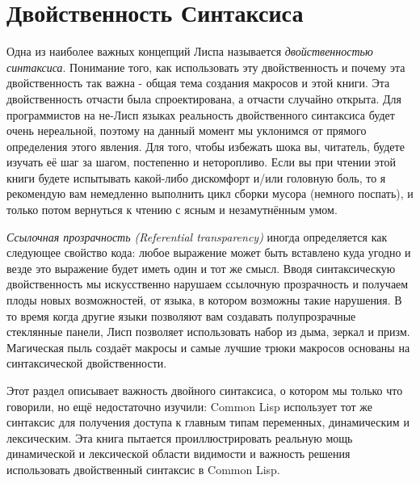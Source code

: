 \section{Двойственность Синтаксиса}\label{section_duality_of_syntax}

Одна из наиболее важных концепций Лиспа называется \emph{двойственностью синтаксиса}. Понимание того, как использовать эту двойственность и почему эта двойственность так важна - общая тема создания макросов и этой книги. Эта двойственность отчасти была спроектирована, а отчасти случайно открыта. Для программистов на не-Лисп языках реальность двойственного синтаксиса будет очень нереальной, поэтому на данный момент мы уклонимся от прямого определения этого явления. Для того, чтобы избежать шока вы, читатель, будете изучать её шаг за шагом, постепенно и неторопливо. Если вы при чтении этой книги будете испытывать какой-либо дискомфорт и/или головную боль, то я рекомендую вам немедленно выполнить цикл сборки мусора (немного поспать), и только потом вернуться к чтению с ясным и незамутнённым умом.

\emph{Ссылочная прозрачность (Referential transparency)} иногда определяется как следующее свойство кода: любое выражение может быть вставлено куда угодно и везде это выражение будет иметь один и тот же смысл. Вводя синтаксическую двойственность мы искусственно нарушаем ссылочную прозрачность и получаем плоды новых возможностей, от языка, в котором возможны такие нарушения. В то время когда другие языки позволяют вам создавать полупрозрачные стеклянные панели, Лисп позволяет использовать набор из дыма, зеркал и призм. Магическая пыль создаёт макросы и самые лучшие трюки макросов основаны на синтаксической двойственности.

Этот раздел описывает важность двойного синтаксиса, о котором мы только что говорили, но ещё недостаточно изучили: Common Lisp использует тот же синтаксис для получения доступа к главным типам переменных, динамическим и лексическим. Эта книга пытается проиллюстрировать реальную мощь динамической и лексической области видимости и важность решения использовать двойственный синтаксис в Common Lisp.

